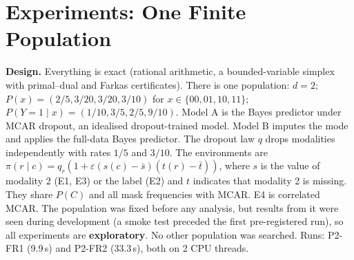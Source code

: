 \documentclass{article}
\theoremstyle{plain}
\theoremstyle{definition}
\theoremstyle{remark}
\newcommand{\Dnat}{\Delta_{\mathrm{nat}}}
\newcommand{\Mcc}{\mathcal{M}_{\mathrm{cc}}}
\begin{document}
\section{Experiments: One Finite Population}
\label{sec:exp}

\textbf{Design.} Everything is exact (rational arithmetic, a bounded-variable
simplex with primal--dual and Farkas certificates). There is one population:
$d=2$; $P(x)=(2/5,3/20,3/20,3/10)$ for $x\in\{00,01,10,11\}$;
$P(Y=1\mid x)=(1/10,3/5,2/5,9/10)$. Model A is the Bayes predictor under
MCAR dropout, an idealised dropout-trained model. Model B imputes the mode and
applies the full-data Bayes predictor. The dropout law $q$ drops modalities
independently with rates $1/5$ and $3/10$. The environments are
$\pi(r\mid c)=q_r(1+\varepsilon(s(c)-\bar s)(t(r)-\bar t))$, where $s$ is the
value of modality 2 (E1, E3) or the label (E2) and $t$ indicates that modality
2 is missing. They share $P(C)$ and all mask frequencies with MCAR. E4 is
correlated MCAR. The population was fixed before any analysis, but results
from it were seen during development (a smoke test preceded the first
pre-registered run), so all experiments are \textbf{exploratory}. No other
population was searched. Runs: P2-FR1 (9.9\,s) and P2-FR2 (33.3\,s), both
on 2 CPU threads.

\begin{table}[t]
\centering\small
\caption{Setting-wise interval for $\Dnat$ under $\Mcc(\Gamma)$, MCAR truth
($\Dnat=-0.0253$). ``A'' means the interval lies below 0 (A better) and ``?''
means undetermined. The bottom rows give the width ratio of the separate-risk
interval $[\min R_A-\max R_B,\max R_A-\min R_B]$ to the direct-difference
interval on the same feasible set (P2-FR2-B). Categories: A$^{s}$ strict,
A$^{w}$ weak (0 attained), $\pm$ both orders; $^{\dagger}$ at least one
endpoint is closure-only; A$^{0}$ strict for every valid law without a uniform
margin. Attainment uses $\max\eta$ with every required $\rho\ge\eta$.}
\label{tab:fr2}

\end{table}
\end{document}

